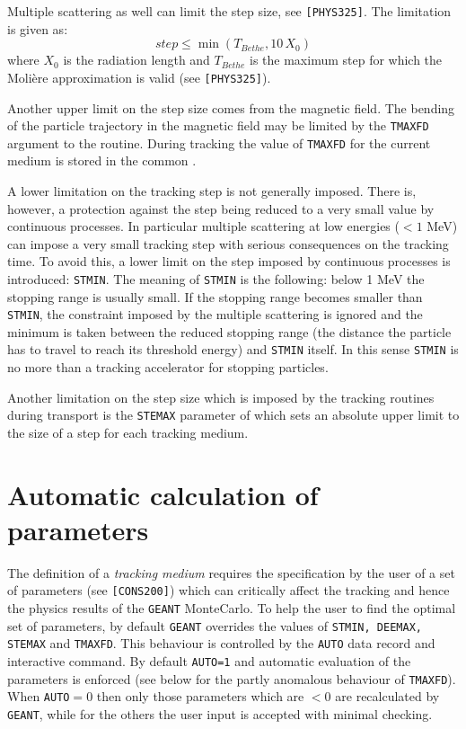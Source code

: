 Multiple scattering as well can limit the step size, see
{\tt [PHYS325]}. The limitation is given as:
\[ 
step \leq \min \left( T_{Bethe}, 10 \, X_0 \right)
\]
where $X_0$ is the radiation length and $T_{Bethe}$ is the maximum step
for which the Moli\`ere approximation is valid (see {\tt [PHYS325]}).
 
Another upper limit on the step size comes from the
magnetic field. The bending of the particle trajectory
in the magnetic field may be
limited by the {\tt TMAXFD} argument to the  routine.
During tracking the
value of {\tt TMAXFD} for the current medium is
stored in the common .
 
A lower limitation on the tracking step is not generally imposed. There
is, however, a protection against the step being reduced to a very small
value by continuous processes. In particular multiple scattering at low
energies ($< 1$ MeV) can impose a very small tracking step with serious
consequences on the tracking time. To avoid this, a lower limit on the
step imposed by continuous processes is introduced: {\tt STMIN}.
The meaning of {\tt STMIN} is the following:
below 1 MeV
the stopping range is usually small. If the
stopping range becomes smaller than {\tt STMIN}, the constraint imposed
by the multiple scattering is ignored and the minimum is taken between
the reduced stopping range (the distance the particle has to travel
to reach its threshold energy) and {\tt STMIN} itself. In this sense 
{\tt STMIN} is no more than a tracking accelerator for stopping 
particles.
 
Another limitation on the step size which is imposed by the tracking
routines during transport is the {\tt STEMAX} parameter of
 which sets an absolute upper limit to the size of a
step for each tracking medium.
 
\section{Automatic calculation of parameters}
The definition of a {\it tracking medium} requires the specification
by the user of a set of parameters (see {\tt [CONS200]}) which can
critically affect the tracking and hence the physics results of the
{\tt GEANT} MonteCarlo. To help the user to find the optimal set of
parameters, by default {\tt GEANT} overrides the values of
{\tt STMIN, DEEMAX, STEMAX} and {\tt TMAXFD}. This behaviour is
controlled by the {\tt AUTO} data record and interactive command. By
default {\tt AUTO=1} and automatic evaluation of the parameters
is enforced (see below for the partly
anomalous behaviour of {\tt TMAXFD}). When {\tt AUTO}$=0$ then only those
parameters which are $ < 0$ are recalculated by {\tt GEANT}, while
for the others the user input is accepted with minimal checking.
 
